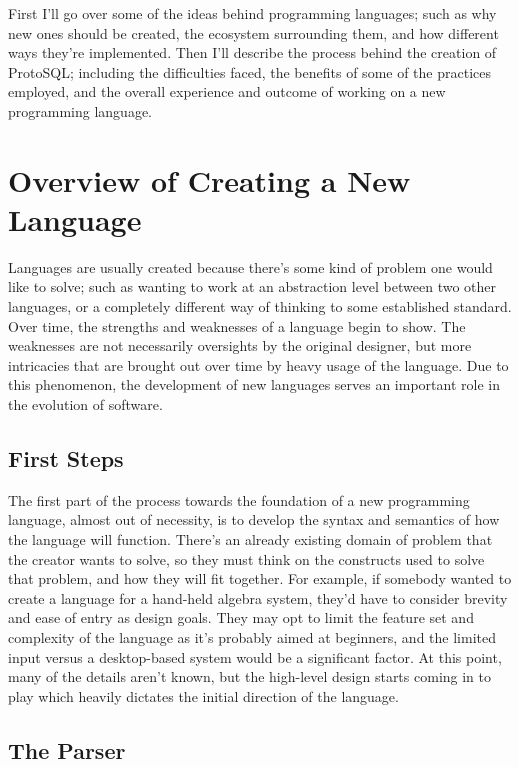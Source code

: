 \documentclass[titlepage]{article}
\begin{document}
		First I'll go over some of the ideas behind programming languages; such as why new ones should be created, the ecosystem surrounding them, and how different ways they're implemented.  Then I'll describe the process behind the creation of ProtoSQL; including the difficulties faced, the benefits of some of the practices employed, and the overall experience and outcome of working on a new programming language.

	\section{Overview of Creating a New Language}

		Languages are usually created because there's some kind of problem one would like to solve; such as wanting to work at an abstraction level between two other languages, or a completely different way of thinking to some established standard.  Over time, the strengths and weaknesses of a language begin to show.  The weaknesses are not necessarily oversights by the original designer, but more intricacies that are brought out over time by heavy usage of the language.  Due to this phenomenon, the development of new languages serves an important role in the evolution of software.

		\subsection{First Steps}

			The first part of the process towards the foundation of a new programming language, almost out of necessity, is to develop the syntax and semantics of how the language will function.  There's an already existing domain of problem that the creator wants to solve, so they must think on the constructs used to solve that problem, and how they will fit together.  For example, if somebody wanted to create a language for a hand-held algebra system, they'd have to consider brevity and ease of entry as design goals.  They may opt to limit the feature set and complexity of the language as it's probably aimed at beginners, and the limited input versus a desktop-based system would be a significant factor.  At this point, many of the details aren't known, but the high-level design starts coming in to play which heavily dictates the initial direction of the language.

		\subsection{The Parser}
\end{document}
